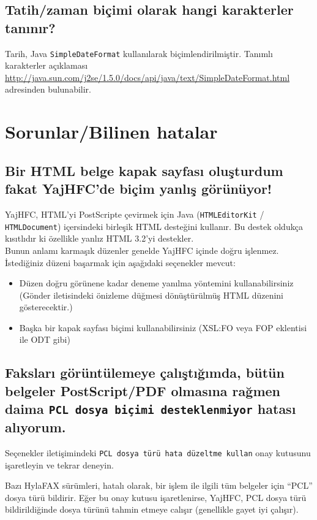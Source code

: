 \documentclass[a4paper,10pt]{scrartcl}
\begin{document}
\subsection{Tatih/zaman biçimi olarak hangi karakterler tanınır?}

Tarih, Java \texttt{SimpleDateFormat} kullanılarak biçimlendirilmiştir. Tanımlı karakterler açıklaması \url{http://java.sun.com/j2se/1.5.0/docs/api/java/text/SimpleDateFormat.html} adresinden bulunabilir.

\section{Sorunlar/Bilinen hatalar}

\subsection{Bir HTML belge kapak sayfası oluşturdum fakat YajHFC'de biçim yanlış görünüyor!}

YajHFC, HTML'yi PostScripte çevirmek için Java (\texttt{HTMLEditorKit} / \texttt{HTMLDocument}) içersindeki birleşik HTML desteğini kullanır. Bu destek oldukça kısıtlıdır ki özellikle yanlız HTML 3.2'yi destekler.\\
Bunun anlamı karmaşık düzenler genelde YajHFC içinde doğru işlenmez.
İstediğiniz düzeni başarmak için aşağıdaki seçenekler mevcut:

\begin{itemize}
 \item Düzen doğru görünene kadar deneme yanılma yöntemini kullanabilirsiniz (Gönder iletisindeki önizleme düğmesi dönüştürülmüş HTML düzenini gösterecektir.)
 \item Başka bir kapak sayfası biçimi kullanabilirsiniz (XSL:FO veya FOP eklentisi ile ODT gibi)
\end{itemize}

\subsection{Faksları görüntülemeye çalıştığımda, bütün belgeler PostScript/PDF olmasına rağmen daima 
   \texttt{PCL dosya biçimi desteklenmiyor} hatası alıyorum.}

Seçenekler iletişimindeki \texttt{PCL dosya türü hata düzeltme kullan} onay kutusunu işaretleyin ve tekrar deneyin.

Bazı HylaFAX sürümleri, hatalı olarak, bir işlem ile ilgili tüm belgeler için
``PCL'' dosya türü bildirir. Eğer bu onay kutusu işaretlenirse, YajHFC, 
PCL dosya türü bildirildiğinde dosya türünü tahmin etmeye calışır (genellikle gayet iyi çalışır). 
\end{document}
